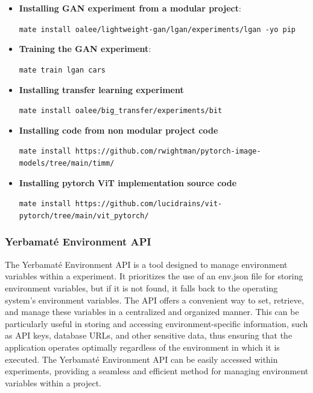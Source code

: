 \documentclass{article}
\begin{document}
\begin{itemize}
    \item \textbf{Installing GAN experiment from a modular project}: 

    \texttt{mate install oalee/lightweight-gan/lgan/experiments/lgan -yo pip}

    \item \textbf{Training the GAN experiment}: 
    
    \texttt{mate train lgan cars}
    
    \item \textbf{Installing transfer learning experiment}

    \texttt{mate install oalee/big\_transfer/experiments/bit}
    
    \item \textbf{Installing code from non modular project code}

    \texttt{mate install https://github.com/rwightman/pytorch-image-models/tree/main/timm/}

    \item \textbf{Installing pytorch ViT implementation source code}
    
    \texttt{mate install https://github.com/lucidrains/vit-pytorch/tree/main/vit\_pytorch/}

\end{itemize}





\subsubsection{Yerbamaté Environment API}

The Yerbamaté Environment API is a tool designed to manage environment variables within a experiment. It prioritizes the use of an env.json file for storing environment variables, but if it is not found, it falls back to the operating system's environment variables. The API offers a convenient way to set, retrieve, and manage these variables in a centralized and organized manner. This can be particularly useful in storing and accessing environment-specific information, such as API keys, database URLs, and other sensitive data, thus ensuring that the application operates optimally regardless of the environment in which it is executed. The Yerbamaté Environment API can be easily accessed within experiments, providing a seamless and efficient method for managing environment variables within a project. 
\end{document}
